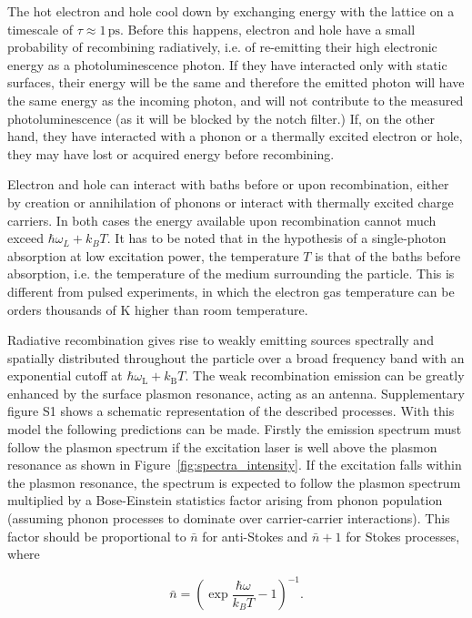 \documentclass[journal=nalefd,manuscript=letter]{achemso}
\newcommand{\ps}{\ensuremath{\,\textrm{ps}}}
\begin{document}
The hot electron and hole cool down by exchanging energy with the lattice on a
timescale of $\tau\approx1\ps$\cite{Pustovalov2005}. Before this happens,
electron and hole have a small probability of recombining radiatively, i.e. of 
re-emitting their high electronic energy as a photoluminescence photon. If they
have interacted only with static surfaces, their energy will be the same and
therefore the emitted photon will have the same energy as the incoming
photon, and will not contribute to the measured photoluminescence (as it will be
blocked by the notch filter.) If, on the other hand, they have interacted with a
phonon or a thermally excited electron or hole, they may have lost or acquired
energy before recombining.

Electron and hole can interact with baths before or upon recombination, either by
creation or annihilation of phonons or interact with thermally excited charge
carriers. In both cases the energy available upon
recombination cannot much exceed $\hbar\omega_L+k_BT$. It has to be noted that
in the hypothesis of a single-photon absorption at low excitation power, the
temperature $T$ is that of the baths before absorption, i.e. the temperature of
the medium surrounding the particle. This is different from pulsed experiments,
in which the electron gas temperature can be orders thousands of K higher than
room temperature\cite{Baffou2013a}. 

Radiative recombination gives rise to weakly emitting sources spectrally and
spatially distributed throughout the particle over a broad frequency band with
an exponential cutoff at $\hbar\omega_\textrm{L}+k_\textrm{B}T$. The weak
recombination emission can be greatly enhanced by the surface plasmon resonance,
acting as an antenna. Supplementary figure S1 shows a schematic representation
of the described processes. With this model the following predictions can be made.
Firstly the emission spectrum must follow the plasmon spectrum if the excitation
laser is well above the plasmon resonance as shown in \mbox{Figure
\ref{fig:spectra_intensity}}. If the excitation falls within the
plasmon resonance, the spectrum is expected to follow the plasmon spectrum
multiplied by a Bose-Einstein statistics factor arising from phonon population
(assuming phonon processes to dominate over carrier-carrier interactions).
This factor should be proportional to $\bar{n}$ for anti-Stokes and $\bar{n}+1$
for Stokes processes, where

\begin{equation}\label{eqn:BE}
	\bar{n}=\left(\exp\frac{\hbar\omega}{k_BT}-1\right)^{-1}.
\end{equation}
\end{document}
